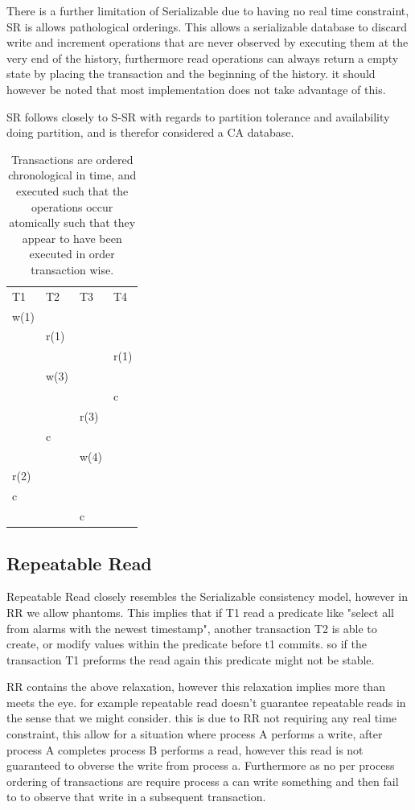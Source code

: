 \documentclass[a4paper,10pt,titlepage]{report}
\begin{document}
There is a further limitation of Serializable due to having no real time constraint, SR is allows pathological orderings. This allows a serializable database to discard write and increment operations that are never observed by executing them at the very end of the history, furthermore read operations can always return a empty state by placing the transaction and the beginning of the history. it should however be noted that most implementation does not take advantage of this.

SR follows closely to S-SR with regards to partition tolerance and availability doing partition, and is therefor considered a CA database.

\begin{table}[h]
\begin{tabular}{l|l|l|l}
T1   & T2   & T3   & T4   \\
w(1) &      &      &      \\
     & r(1) &      &      \\
     &      &      & r(1) \\
     & w(3) &      &      \\
     &      &      & c    \\
     &      & r(3) &      \\
     & c    &      &      \\
     &      & w(4) &      \\
r(2) &      &      &      \\
c    &      &      &      \\
     &      & c    &      
\end{tabular}
\caption{Transactions are ordered chronological in time, and executed such that the operations occur atomically such that they appear to have been executed in order transaction wise. }
\end{table}
\newpage
\subsection{Repeatable Read}

Repeatable Read closely resembles the Serializable consistency model, however in RR we allow phantoms. This implies that if T1 read a predicate like "select all from alarms with the newest timestamp", another transaction T2 is able to create, or modify values within the predicate before t1 commits. so if the transaction T1 preforms the read again this predicate might not be stable. 

RR contains the above relaxation, however this relaxation implies more than meets the eye. for example repeatable read doesn't guarantee repeatable reads in the sense that we might consider. this is due to RR not requiring any real time constraint, this allow for a situation where process A performs a write, after process A completes process B performs a read, however this read is not guaranteed to obverse the write from process a. Furthermore as no per process ordering of transactions are require process a can write something and then fail to to observe that write in a subsequent transaction. 
\end{document}
